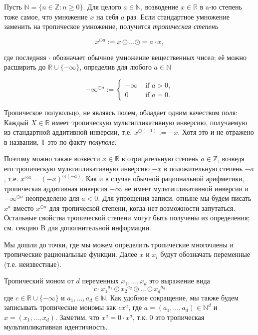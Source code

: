 \documentclass[russian]{lecture-notes}
\begin{document}
	Пусть $ \mathbb{N} = \{n \in \mathbb{Z} : n \geq 0\}$. Для целого $a \in \mathbb{N}$, возводение $x \in \mathbb{R}$ в a-ю степень тоже самое, что умножение $x$ на себя $a$ раз. Если стандартное умножение заменить на тропическое умножение, получится \textit{тропическая степень}

	\begin{equation*}
	x^{\odot a} := x \odot ... \odot = a \cdot x,
	\end{equation*}
	
	где последняя $\cdot$ обозначает обычное умножение вещественных чисел; её можно расширить до $\mathbb{R} \cup \{- \infty\}$, определив для любого $a \in \mathbb{N}$
	
	\begin{equation*}
	- \infty^{\odot a} := 
		\begin{cases}
		- \infty & \mbox{ if } a > 0, \\
		0 & \mbox{ if } a = 0.
		\end{cases}
	\end{equation*}
	
	Тропическое полукольцо, не являясь полем, обладает одним качеством поля: Каждый $X \in \mathbb{R}$ имеет тропическую мультипликативную инверсию, получаемую из стандартной аддитивной инверсии, т.е. $x^{\odot (-1)} := -x$. Хотя это и не отражено в названии, $\mathbb{T}$ это по факту \textit{полуполе}.

	Поэтому можно также возвести $x \in \mathbb{R}$ в отрицательную степень $a \in \mathbb{Z}$, возведя его тропическую мультипликативную инверсию $-x$ в положительную степень $-a$, т.е. $x^{\odot a} = (-x)^{\odot (-a)}$. Как и в случае обычной рациональной арифметики, тропическая аддитивная инверсия $- \infty$ не имеет мультипликативной инверсии и $- \infty^{\odot a}$ неопределено для $a < 0$. Для упрощения записи, отныне мы будем писать $x^a$ вместо $x^{\odot a}$ для тропической степени, когда нет возможности запутаться. Остальные свойства тропической степени могут быть получены из определения; см. секцию B для дополнительной информации.
	
	Мы дошли до точки, где мы можем определить тропические многочлены и тропические рациональные функции. Далее $x$ и $x_i$ будут обозначать переменные (т.е. неизвестные).
	
	\begin{Definition}
		Тропический моном от $d$ переменных $x_1,...,x_d$ это выражение вида
		\begin{equation*}
		c \cdot {x_1}^{a_1} \odot {x_2}^{a_2} \odot ... \odot {x_d}^{a_d}
		\end{equation*}
		где $c \in \mathbb{R} \cup \{- \infty\}$ и $a_1,...,a_d \in \mathbb{N}$. Как удобное сокращение, мы также будем записывать тропические мономы как $cx^a$, где $a = (a_1,...,a_d) \in \mathbb{N}^d$ и $x = (x_1,...,x_d)$. Заметим, что $x^a = 0 \cdot x^a$, т.к. 0 это тропическая мультипликативная идентичность.
	\end{Definition}
\end{document}
